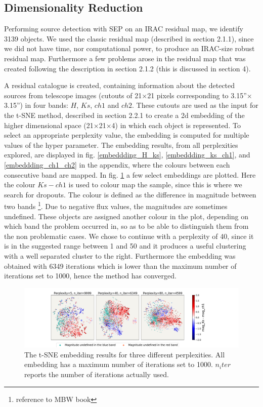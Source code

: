 \subsection{Dimensionality Reduction}
Performing source detection with SEP on an IRAC residual map, we identify 3139 objects. We used the classic residual map (described in section 2.1.1), since we did not have time, nor computational power, to produce an IRAC-size robust residual map. Furthermore a few problems arose in the residual map that was created following the description in section 2.1.2 (this is discussed in section 4). 

A residual catalogue is created, containing  information about the detected sources from telescope images (cutouts of 21$\times$21 pixels corresponding to 3.15''$\times$3.15'') in four bands: $H$, $Ks$, $ch1$ and $ch2$. These cutouts are used as the input for the t-SNE method, described in section 2.2.1 to create a 2d embedding of the higher dimensional space (21$\times$21$\times$4) in which each object is represented. To select an appropriate perplexity value, the embedding is computed for multiple values of the hyper parameter. The embedding results, from all perplexities explored, are displayed in fig. \ref{embeddding_H_ks}, \ref{embeddding_ks_ch1}, and \ref{embeddding_ch1_ch2} in the appendix, where the colours between each consecutive band are mapped. In fig. \ref{SMALL_embeddding_ks_ch1} a few select embeddings are plotted. Here the colour $Ks-ch1$ is used to colour map the sample, since this is where we search for dropouts. The colour is defined as the difference in magnitude between two bands \footnote{reference to MBW book}. Due to negative flux values, the magnitudes are sometimes undefined. These objects are assigned another colour in the plot, depending on which band the problem occurred in, so as to be able to distinguish them from the non problematic cases. We chose to continue with a perplexity of 40, since it is in the suggested range between 1 and 50 and it produces a useful clustering with a well separated cluster to the right. Furthermore the embedding was obtained with 6349 iterations which is lower than the maximum number of iterations set to 1000, hence the method has converged.
\begin{figure}[]
    \centering %
    \includegraphics[trim={5cm 0cm 5cm 0.5cm},clip,width=\textwidth]{Code/Saved_Figures/peplex_Ks_ch1_SMALL.pdf}
    \caption{The t-SNE embedding results for three different perplexities. All embedding has a maximum number of iterations set to 1000. $n_iter$ reports the number of iterations actually used.}
    \label{SMALL_embeddding_ks_ch1}
\end{figure}

